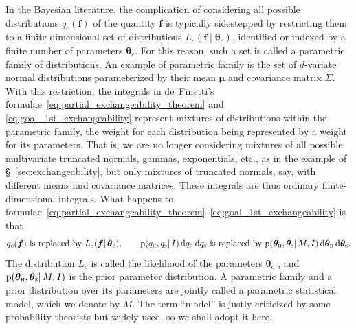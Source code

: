\documentclass[%
]{frontiersSCNS-nologo} %
\newcommand*{\sect}{\S} %
\newcommand*{\eg}{e.g.}
\newcommand*{\etc}{etc.}
\newcommand*{\amp}{\&}
\newcommand*{\di}{\mathrm{d}}%
\newcommand*{\pf}{\mathrm{p}}%
\renewcommand*{\|}{\mathpunct{|}}%
\newcommand*{\yh}{c}
\newcommand*{\yhu}{\textsc{h}}
\newcommand*{\yhd}{\textsc{s}}
\newcommand*{\yxx}{f}
\newcommand*{\yx}{\bm{\yxx}}
\newcommand*{\yp}{q}
\newcommand*{\yph}{q_{\yhu}}
\newcommand*{\yps}{q_{\yhd}}
\newcommand*{\yd}{d}
\newcommand*{\yI}{I}
\newcommand*{\yM}{M}
\newcommand*{\yth}{\bm{\theta}}
\newcommand*{\ythh}{\yth_{\yhu}}
\newcommand*{\yths}{\yth_{\yhd}}
\newcommand*{\yL}{L}
\begin{document}
In the Bayesian literature, the complication of considering all possible
distributions $\yp_{\yh}(\yx)$ of the quantity $\yx$ is typically
sidestepped by restricting them to a finite-dimensional set of
distributions $\yL_{\yh}(\yx \| \yth_{\yh})$, identified or indexed by a
finite number of parameters $\yth_{\yh}$. For this reason, such a set is
called a parametric family of distributions. An example of parametric
family is the set of $\yd$-variate normal distributions parameterized by
their mean $\bm{\mu}$ and covariance matrix $\bm{\varSigma}$. With this
restriction, the integrals in de~Finetti's
formulae~\eqref{eq:partial_exchangeability_theorem} and
\eqref{eq:goal_1st_exchangeability} represent mixtures of distributions
within the parametric family, the weight for each distribution being
represented by a weight for its parameters. That is, we are no longer
considering mixtures of all possible multivariate truncated normals,
gammas, exponentials, \etc, as in the example of
\sect~\ref{sec:exchangeability}, but only mixtures of truncated normals,
say, with different means and covariance matrices. These integrals are thus
ordinary finite-dimensional integrals. What happens to
formulae~\eqref{eq:partial_exchangeability_theorem}--\eqref{eq:goal_1st_exchangeability}
is that
\begin{equation}
  \label{eq:replacement_by_model}
  \yp_{\yh}(\yx) \text{ is replaced by } \yL_{\yh}(\yx \|\yth_{\yh}), \qquad
  \pf(\yph,\yps \| \yI)\,\di\yph\,\di\yps \text{ is replaced by }
  \pf(\ythh,\yths \| \yM,\yI)\,\di\ythh\,\di\yths.
\end{equation}
The distribution $\yL_{\yh}$ is called the likelihood of the parameters
$\yth_{\yh}$ , and $\pf(\ythh,\yths \| \yM, \yI)$ is the prior parameter
distribution. A parametric family and a prior distribution over its parameters
are jointly called a parametric statistical model, which we denote by
$\yM$. The term \enquote{model} is justly criticized by some probability
theorists \citep[see \eg\ Besag \amp\ Kalman in][]{besagetal2002} but widely
used, so we shall adopt it here.
\end{document}

